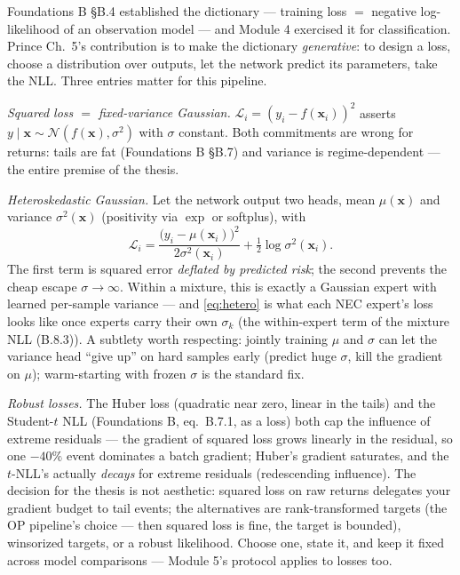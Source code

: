 \documentclass[11pt]{article}
\numberwithin{equation}{section}
\theoremstyle{plain}
\theoremstyle{definition}
\theoremstyle{remark}
\newcounter{exercise}
\newcommand{\Normal}{\mathcal{N}}
\newcommand{\x}{\bm{x}}
\begin{document}
Foundations B \S B.4 established the dictionary --- training loss $=$ negative log-likelihood of an observation model --- and Module 4 exercised it for classification. Prince Ch.\ 5's contribution is to make the dictionary \emph{generative}: to design a loss, choose a distribution over outputs, let the network predict its parameters, take the NLL. Three entries matter for this pipeline.

\emph{Squared loss $=$ fixed-variance Gaussian.} $\mathcal{L}_i = (y_i - f(\x_i))^2$ asserts $y \mid \x \sim \Normal(f(\x), \sigma^2)$ with $\sigma$ constant. Both commitments are wrong for returns: tails are fat (Foundations B \S B.7) and variance is regime-dependent --- the entire premise of the thesis.

\emph{Heteroskedastic Gaussian.} Let the network output two heads, mean $\mu(\x)$ and variance $\sigma^2(\x)$ (positivity via $\exp$ or softplus), with
\begin{equation}
\mathcal{L}_i = \frac{\big(y_i - \mu(\x_i)\big)^2}{2\sigma^2(\x_i)} + \tfrac12 \log \sigma^2(\x_i) .
\label{eq:hetero}
\end{equation}
The first term is squared error \emph{deflated by predicted risk}; the second prevents the cheap escape $\sigma \to \infty$. Within a mixture, this is exactly a Gaussian expert with learned per-sample variance --- and \eqref{eq:hetero} is what each NEC expert's loss looks like once experts carry their own $\sigma_k$ (the within-expert term of the mixture NLL (B.8.3)). A subtlety worth respecting: jointly training $\mu$ and $\sigma$ can let the variance head ``give up'' on hard samples early (predict huge $\sigma$, kill the gradient on $\mu$); warm-starting with frozen $\sigma$ is the standard fix.

\emph{Robust losses.} The Huber loss (quadratic near zero, linear in the tails) and the Student-$t$ NLL (Foundations B, eq.\ B.7.1, as a loss) both cap the influence of extreme residuals --- the gradient of squared loss grows linearly in the residual, so one $-40\%$ event dominates a batch gradient; Huber's gradient saturates, and the $t$-NLL's actually \emph{decays} for extreme residuals (redescending influence). The decision for the thesis is not aesthetic: squared loss on raw returns delegates your gradient budget to tail events; the alternatives are rank-transformed targets (the OP pipeline's choice --- then squared loss is fine, the target is bounded), winsorized targets, or a robust likelihood. Choose one, state it, and keep it fixed across model comparisons --- Module 5's protocol applies to losses too.
\end{document}
